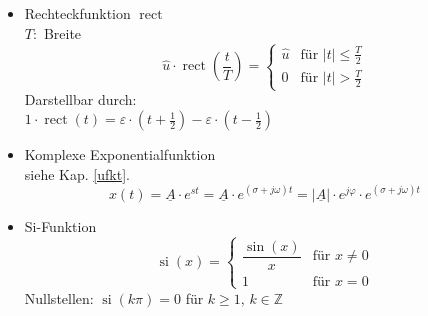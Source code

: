 \begin{mdframed}[style=exercise]
\begin{itemize}[leftmargin=*]
          \item{Rechteckfunktion $\operatorname{rect}$}\\
          $T:$ Breite
          \[ \hat{u} \cdot \operatorname{rect}\left(\frac{t}{T}\right) =
             \begin{cases}
                 \hat{u} & \text{f\"ur } \vert t\rvert \leq \frac{T}{2}\\
                 0 & \text{f\"ur } \vert t\rvert > \frac{T}{2}
             \end{cases}
          \]
          Darstellbar durch:\\ $1\cdot  \operatorname{rect}(t) = \varepsilon\cdot\left( t+\frac{1}{2} \right)-\varepsilon\cdot\left( t-\frac{1}{2} \right)$
          \item{Komplexe Exponentialfunktion}\\
          siehe Kap. \ref{ufkt}.
          \[ x(t)=\underline{A}\cdot e^{st} = \underline{A}\cdot e^{(\sigma+j\omega)t} = |\underline{A}|\cdot e^{j\varphi} \cdot e^{(\sigma+j\omega)t}
          \]
          \item Si-Funktion
                    \[ \operatorname{si}(x) =
          \begin{cases}
          	\dfrac{\sin(x)}{x} & \text{f\"ur } x\neq 0\\
          	1 & \text{f\"ur } x = 0
          \end{cases}
          \]
          Nullstellen: $\operatorname{si}(k\pi)=0$ für $k\ge1,\, k\in \mathbb{Z}$
      \end{itemize}
  \end{mdframed}
